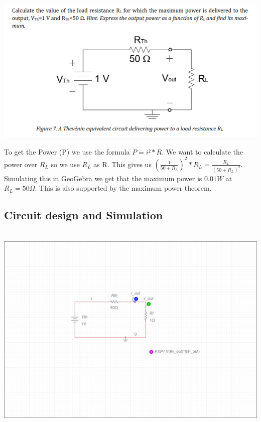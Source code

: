 \documentclass[11pt]{article}
\begin{document}
\includegraphics[width=\linewidth]{5.1 calculations.png}


\noindent
To get the Power (P) we use the formula $P = i² * R$. We want to calculate the power over $R_{L}$  so we use $R_{L}$ as R.
 This gives us $(\frac{1}{50 + R_{L}})^2 * R_{L} = \frac{R_{L}}{(50 + R_{L})^2}$. Simulating this in GeoGebra we get that the maximum power is $0.01W$ at
 $R_{L} = 50\Omega$. This is also supported by the maximum power theorem. 

\subsection[25pt]{\bf{Circuit design and Simulation}}

\noindent
\\
\includegraphics[width=\linewidth]{circuits/Lab 1 Task 5-schematic.png}
\end{document}

